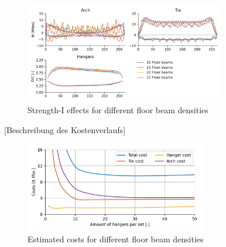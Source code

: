 \begin{figure}[H]
    \centering
    \includegraphics[trim={0 0.4cm 0 0.4cm},clip, width=0.78\textwidth]{calculations/floor beam comparison/strength-I.png}
    \caption{Strength-I effects for different floor beam densities}
    \label{fig:fb_strength}
\end{figure}

[Beschreibung des Kostenverlaufs]

\begin{figure}[H]
    \centering
    \includegraphics[width=0.7\textwidth]{calculations/floor beam comparison/cost comparison.png}
    \caption{Estimated costs for different floor beam densities}
    \label{fig:fb_costs}
\end{figure}
